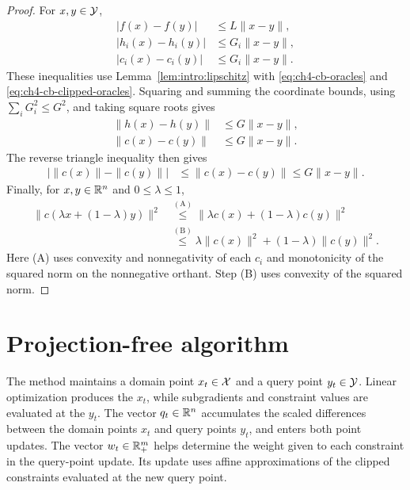 \begin{proof}
For $x,y\in\mathcal{Y}$,
\begin{equation}\label{eq:ch4-cb-scalar-lipschitz}
\begin{aligned}
|f(x)-f(y)|&\le L\|x-y\|,\\
|h_i(x)-h_i(y)|&\le G_i\|x-y\|,\\
|c_i(x)-c_i(y)|&\le G_i\|x-y\|.
\end{aligned}
\end{equation}
These inequalities use Lemma~\ref{lem:intro:lipschitz} with
\eqref{eq:ch4-cb-oracles} and \eqref{eq:ch4-cb-clipped-oracles}.
Squaring and summing the coordinate bounds, using
$\sum_iG_i^2\le G^2$, and taking square roots gives
\begin{equation}\label{eq:ch4-cb-lipschitz}
\begin{aligned}
\|h(x)-h(y)\|&\le G\|x-y\|,\\
\|c(x)-c(y)\|&\le G\|x-y\|.
\end{aligned}
\end{equation}
The reverse triangle inequality then gives
\begin{equation}\label{eq:ch4-cb-v-lipschitz}
\begin{aligned}
\bigl|\|c(x)\|-\|c(y)\|\bigr|
&\le\|c(x)-c(y)\|\le G\|x-y\|.
\end{aligned}
\end{equation}
Finally, for $x,y\in\mathbb{R}^n$ and $0\le\lambda\le1$,
\begin{equation}\label{eq:ch4-cb-squared-violation-convexity}
\begin{aligned}
\|c(\lambda x+(1-\lambda)y)\|^2
&\overset{\mathrm{(A)}}{\le}
\|\lambda c(x)+(1-\lambda)c(y)\|^2\\
&\overset{\mathrm{(B)}}{\le}
\lambda\|c(x)\|^2+(1-\lambda)\|c(y)\|^2.
\end{aligned}
\end{equation}
Here (A) uses convexity and nonnegativity of each $c_i$ and monotonicity
of the squared norm on the nonnegative orthant. Step (B) uses convexity of the
squared norm.
\end{proof}

\section{Projection-free algorithm}
\label{sec:ch2-development}

The method maintains a domain point $x_t\in\mathcal{X}$ and a query point
$y_t\in\mathcal{Y}$. Linear optimization produces the $x_t$, while
subgradients and constraint values are evaluated at the $y_t$.
The vector $q_t\in\mathbb{R}^n$ accumulates the scaled differences between the
domain points $x_t$ and query points $y_t$, and enters both point updates.
The vector $w_t\in\mathbb{R}_+^m$ helps determine the weight given to each
constraint in the query-point update. Its update uses affine
approximations of the clipped constraints evaluated at the new query point.


